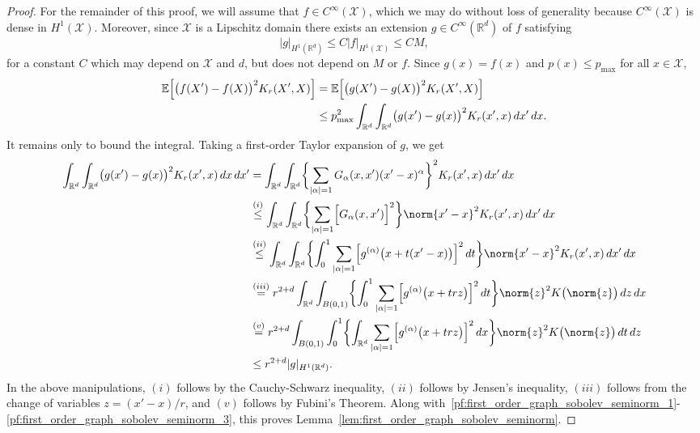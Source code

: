 \documentclass{article}
\newcommand{\Reals}{\mathbb{R}}
\newcommand{\abs}[1]{\left \lvert #1 \right \rvert}
\newcommand{\1}{\mathbf{1}}
\newcommand{\Rd}{\Reals^d}
\newcommand{\Xset}{\mathcal{X}}
\newcommand{\Ebb}{\mathbb{E}}
\theoremstyle{alden}
\theoremstyle{aldenthm}
\theoremstyle{definition}
\theoremstyle{remark}
\begin{document}
\begin{proof}
	For the remainder of this proof, we will assume that $f \in C^{\infty}(\Xset)$, which we may do without loss of generality because $C^{\infty}(\Xset)$ is dense in $H^1(\Xset)$. Moreover, since $\Xset$ is a Lipschitz domain there exists an extension $g \in C^{\infty}(\Rd)$ of $f$ satisfying
	\begin{equation}
	\label{pf:first_order_graph_sobolev_seminorm_2}
	|g|_{H^1(\Rd)} \leq C|f|_{H^1(\Xset)} \leq C M,
	\end{equation}
	for a constant $C$ which may depend on $\Xset$ and $d$, but does not depend on $M$ or $f$. Since $g(x) = f(x)$ and $p(x) \leq p_{\max}$ for all $x \in \Xset$, 
	\begin{align}
	\Ebb\Bigl[\bigl(f(X') - f(X)\bigr)^2K_r(X',X)\Bigr] & = \Ebb\Bigl[\bigl(g(X') - g(X)\bigr)^2K_r(X',X)\Bigr] \nonumber \\
	& \leq p_{\max}^2 \int_{\Reals^d} \int_{\Reals^d} \bigl(g(x') - g(x)\bigr)^2 K_r(x',x) \,dx' \,dx. \label{pf:first_order_graph_sobolev_seminorm_3}
	\end{align}
	It remains only to bound the integral. Taking a first-order Taylor expansion of $g$, we get
	\begin{align*}
	\int_{\Reals^d} \int_{\Reals^d} \bigl(g(x') - g(x)\bigr)^2 K_r(x',x) \,dx \,dx' & = \int_{\Rd} \int_{\Rd} \biggl\{\sum_{\abs{\alpha} = 1}G_{\alpha}(x,x') (x' - x)^{\alpha}\biggr\}^2 K_r(x',x) \,dx' \,dx \\ 
	& \overset{(i)}{\leq}  \int_{\Rd} \int_{\Rd} \biggl\{\sum_{\abs{\alpha} = 1}\Bigl[G_{\alpha}(x,x')\Bigr]^2\biggr\} \norm{x' - x}^2  K_r(x',x) \,dx' \,dx \\
	& \overset{(ii)}{\leq} \int_{\Rd} \int_{\Rd} \biggl\{\int_{0}^{1} \sum_{\abs{\alpha} = 1} \Bigl[g^{(\alpha)}\bigl(x + t(x' - x)\bigr)\Bigr]^2 \,dt \biggr\} \norm{x' - x}^2 K_r(x',x) \,dx' \,dx \\
	& \overset{(iii)}{=} r^{2 + d} \int_{\Rd} \int_{B(0,1)} \biggl\{\int_{0}^{1} \sum_{\abs{\alpha} = 1} \Bigl[g^{(\alpha)}\bigl(x + trz\bigr)\Bigr]^2 \,dt\biggr\} \norm{z}^2 K\bigl(\norm{z}\bigr)  \,dz \,dx \\
	& \overset{(v)}{=} r^{2 + d} \int_{B(0,1)} \int_{0}^{1} \biggl\{\int_{\Rd} \sum_{\abs{\alpha} = 1} \Bigl[g^{(\alpha)}\bigl(x + trz\bigr)\Bigr]^2 \,dx \biggr\} \norm{z}^2 K\bigl(\norm{z}\bigr) \,dt \,dz \\
	& \leq r^{2 + d} |g|_{H^1(\Rd)}.
	\end{align*}
	In the above manipulations, $(i)$ follows by the Cauchy-Schwarz inequality, $(ii)$ follows by Jensen's inequality, $(iii)$ follows from the change of variables $z = (x' - x)/r$, and $(v)$ follows by Fubini's Theorem. Along with~\eqref{pf:first_order_graph_sobolev_seminorm_1}-\eqref{pf:first_order_graph_sobolev_seminorm_3}, this proves Lemma~\ref{lem:first_order_graph_sobolev_seminorm}.
\end{proof}
\end{document}
